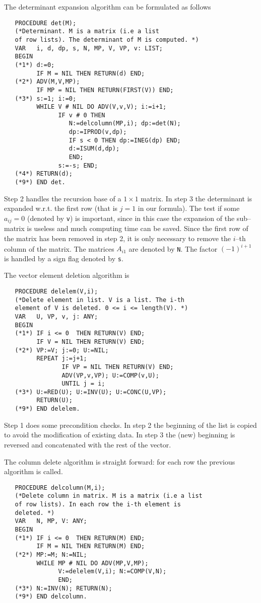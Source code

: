 The determinant expansion algorithm can be formulated as follows 
\begin{verbatim}
   PROCEDURE det(M);
   (*Determinant. M is a matrix (i.e a list 
   of row lists). The determinant of M is computed. *)
   VAR   i, d, dp, s, N, MP, V, VP, v: LIST;
   BEGIN 
   (*1*) d:=0;
         IF M = NIL THEN RETURN(d) END;
   (*2*) ADV(M,V,MP); 
         IF MP = NIL THEN RETURN(FIRST(V)) END;
   (*3*) s:=1; i:=0;
         WHILE V # NIL DO ADV(V,v,V); i:=i+1;
               IF v # 0 THEN 
                  N:=delcolumn(MP,i); dp:=det(N); 
                  dp:=IPROD(v,dp);
                  IF s < 0 THEN dp:=INEG(dp) END; 
                  d:=ISUM(d,dp);
                  END;
               s:=-s; END;
   (*4*) RETURN(d);
   (*9*) END det.
\end{verbatim}
Step 2 handles the recursion base of a $1 \times 1$ matrix.
In step 3 the determinant is expanded w.r.t. the first 
row (that is $j=1$ in our formula).
The test if some $a_{ij} = 0$ 
(denoted by \verb/v/) is important, since in 
this case the expansion of the sub--matrix is useless 
and much computing time can be saved.
Since the first row of the matrix has been removed in step 2,
it is only necessary to remove the $i$--th column of the
matrix. The matrices $A_{i1}$ are denoted by \verb/N/.
The factor $(-1)^{i+1}$ is handled by a sign flag 
denoted by \verb/s/.

The vector element deletion algorithm is
\begin{verbatim}
   PROCEDURE delelem(V,i);
   (*Delete element in list. V is a list. The i-th 
   element of V is deleted. 0 <= i <= length(V). *)
   VAR   U, VP, v, j: ANY;
   BEGIN 
   (*1*) IF i <= 0  THEN RETURN(V) END;
         IF V = NIL THEN RETURN(V) END;
   (*2*) VP:=V; j:=0; U:=NIL;
         REPEAT j:=j+1; 
                IF VP = NIL THEN RETURN(V) END; 
                ADV(VP,v,VP); U:=COMP(v,U); 
                UNTIL j = i;
   (*3*) U:=RED(U); U:=INV(U); U:=CONC(U,VP);
         RETURN(U);
   (*9*) END delelem.
\end{verbatim}
Step 1 does some precondition checks.
In step 2 the beginning of the list is copied to avoid 
the modification of existing data. 
In step 3 the (new) beginning is reversed and 
concatenated with the rest of the vector.

The column delete algorithm is straight forward: 
for each row the previous algorithm is called.
\begin{verbatim}
   PROCEDURE delcolumn(M,i);
   (*Delete column in matrix. M is a matrix (i.e a list 
   of row lists). In each row the i-th element is 
   deleted. *)
   VAR   N, MP, V: ANY;
   BEGIN 
   (*1*) IF i <= 0  THEN RETURN(M) END;
         IF M = NIL THEN RETURN(M) END;
   (*2*) MP:=M; N:=NIL;
         WHILE MP # NIL DO ADV(MP,V,MP); 
               V:=delelem(V,i); N:=COMP(V,N); 
               END;
   (*3*) N:=INV(N); RETURN(N);
   (*9*) END delcolumn.
\end{verbatim}

